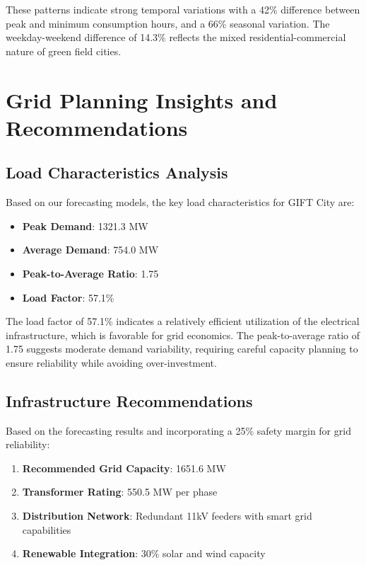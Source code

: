 \documentclass[12pt,a4paper]{article}
\begin{document}
These patterns indicate strong temporal variations with a 42\% difference between peak and minimum consumption hours, and a 66\% seasonal variation. The weekday-weekend difference of 14.3\% reflects the mixed residential-commercial nature of green field cities.

\section{Grid Planning Insights and Recommendations}

\subsection{Load Characteristics Analysis}
Based on our forecasting models, the key load characteristics for GIFT City are:

\begin{itemize}
    \item \textbf{Peak Demand}: 1321.3 MW
    \item \textbf{Average Demand}: 754.0 MW
    \item \textbf{Peak-to-Average Ratio}: 1.75
    \item \textbf{Load Factor}: 57.1\%
\end{itemize}

The load factor of 57.1\% indicates a relatively efficient utilization of the electrical infrastructure, which is favorable for grid economics. The peak-to-average ratio of 1.75 suggests moderate demand variability, requiring careful capacity planning to ensure reliability while avoiding over-investment.

\subsection{Infrastructure Recommendations}
Based on the forecasting results and incorporating a 25\% safety margin for grid reliability:

\begin{enumerate}
    \item \textbf{Recommended Grid Capacity}: 1651.6 MW
    \item \textbf{Transformer Rating}: 550.5 MW per phase
    \item \textbf{Distribution Network}: Redundant 11kV feeders with smart grid capabilities
    \item \textbf{Renewable Integration}: 30\% solar and wind capacity
\end{enumerate}
\end{document}
